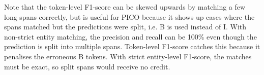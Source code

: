 


Note that the token-level F1-score can be skewed upwards by matching a few long spans correctly, but is useful for PICO because it shows up cases where the spans matched but the predictions were split, i.e. B is used instead of I. With non-strict entity matching, the precision and recall can be 100\% even though the prediction is split into multiple spans.
Token-level F1-score catches this because it penalises the erroneous B tokens. With strict entity-level F1-score, the matches must be exact, so split spans would receive no credit.

